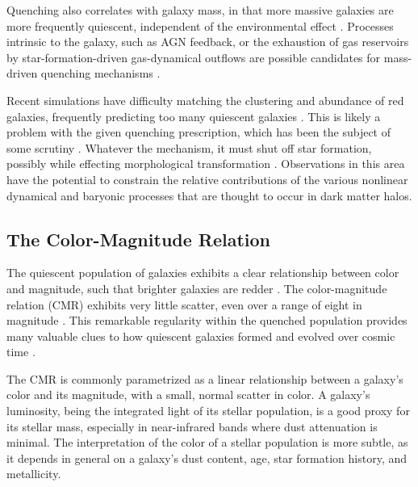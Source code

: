 Quenching also correlates with galaxy mass, in that more massive galaxies are more frequently quiescent, independent of the environmental effect \citep{Kauffmann:2004aa,Baldry:2006aa,Peng:2010aa}.
Processes intrinsic to the galaxy, such as AGN feedback, or the exhaustion of gas reservoirs by star-formation-driven gas-dynamical outflows are possible candidates for mass-driven quenching mechanisms \citep{McGee:2014aa,Balogh:2016aa}.

Recent simulations have difficulty matching the clustering and abundance of red galaxies, frequently predicting too many quiescent galaxies \citep{Coil:2008aa,Weinmann:2011aa,Vulcani:2014aa}.
This is likely a problem with the given quenching prescription, which has been the subject of some scrutiny \citep{McGee:2009aa,McGee:2011aa,Balogh:2016aa}.
Whatever the mechanism, it must shut off star formation, possibly while effecting morphological transformation \citep{Dressler:1980aa}.
Observations in this area have the potential to constrain the relative contributions of the various nonlinear dynamical and baryonic processes that are thought to occur in dark matter halos.

\subsection{The Color-Magnitude Relation}

The quiescent population of galaxies exhibits a clear relationship between color and magnitude, such that brighter galaxies are redder \citep{Bower:1992mb,van-Dokkum:1998wd,Baldry:2004aa,Bell:2004qe}.
The color-magnitude relation (CMR) exhibits very little scatter, even over a range of eight in magnitude \citep{Baldry:2004aa}.
This remarkable regularity within the quenched population provides many valuable clues to how quiescent galaxies formed and evolved over cosmic time \citep{Bower:1992mb,Peebles:2002aa}.

The CMR is commonly parametrized as a linear relationship between a galaxy's color and its magnitude, with a small, normal scatter in color.
A galaxy's luminosity, being the integrated light of its stellar population, is a good proxy for its stellar mass, especially in near-infrared bands where dust attenuation is minimal.
The interpretation of the color of a stellar population is more subtle, as it depends in general on a galaxy's dust content, age, star formation history, and metallicity.

